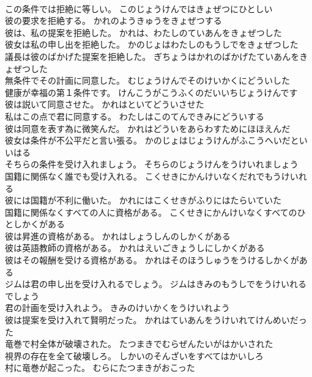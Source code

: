 \documentclass[8pt]{extreport}
\begin{document}
\begin{CJK}{UTF8}{min}
\\	この条件では拒絶に等しい。	このじょうけんではきょぜつにひとしい 
\\	彼の要求を拒絶する。	かれのようきゅうをきょぜつする 
\\	彼は、私の提案を拒絶した。	かれは、わたしのていあんをきょぜつした 
\\	彼女は私の申し出を拒絶した。	かのじょはわたしのもうしでをきょぜつした 
\\	議長は彼のばかげた提案を拒絶した。	ぎちょうはかれのばかげたていあんをきょぜつした 
\\	無条件でその計画に同意した。	むじょうけんでそのけいかくにどういした 
\\	健康が幸福の第１条件です。	けんこうがこうふくのだいいちじょうけんです 
\\	彼は説いて同意させた。	かれはといてどういさせた 
\\	私はこの点で君に同意する。	わたしはこのてんできみにどういする 
\\	彼は同意を表す為に微笑んだ。	かれはどういをあらわすためにほほえんだ 
\\	彼女は条件が不公平だと言い張る。	かのじょはじょうけんがふこうへいだといいはる 
\\	そちらの条件を受け入れましょう。	そちらのじょうけんをうけいれましょう 
\\	国籍に関係なく誰でも受け入れる。	こくせきにかんけいなくだれでもうけいれる 
\\	彼には国籍が不利に働いた。	かれにはこくせきがふりにはたらいていた 
\\	国籍に関係なくすべての人に資格がある。	こくせきにかんけいなくすべてのひとしかくがある 
\\	彼は昇進の資格がある。	かれはしょうしんのしかくがある 
\\	彼は英語教師の資格がある。	かれはえいごきょうしにしかくがある 
\\	彼はその報酬を受ける資格がある。	かれはそのほうしゅうをうけるしかくがある 
\\	ジムは君の申し出を受け入れるでしょう。	ジムはきみのもうしでをうけいれるでしょう 
\\	君の計画を受け入れよう。	きみのけいかくをうけいれよう 
\\	彼は提案を受け入れて賢明だった。	かれはていあんをうけいれてけんめいだった 
\\	竜巻で村全体が破壊された。	たつまきでむらぜんたいがはかいされた 
\\	視界の存在を全て破壊しろ。	しかいのそんざいをすべてはかいしろ 
\\	村に竜巻が起こった。	むらにたつまきがおこった 

\end{CJK}
\end{document}
